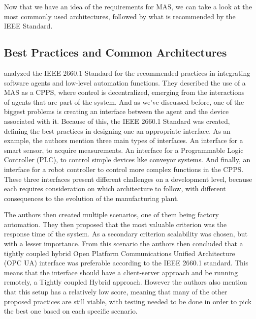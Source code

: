 Now that we have an idea of the requirements for MAS, we can take a look at the most commonly used architectures, followed by what is recommended by the IEEE Standard.

\subsection{Best Practices and Common Architectures}

\citeauthor{Leitao2021} \cite{Leitao2021} analyzed the IEEE 2660.1 Standard for the recommended practices in integrating software agents and low-level automation functions. They described the use of a MAS as a CPPS, where control is decentralized, emerging from the interactions of agents that are part of the system. And as we've discussed before, one of the biggest problems is creating an interface between the agent and the device associated with it. Because of this, the IEEE 2660.1 Standard was created, defining the best practices in designing one an appropriate interface.
As an example, the authors mention three main types of interfaces. An interface for a smart sensor, to acquire measurements. An interface for a Programmable Logic Controller (PLC), to control simple devices like conveyor systems. And finally, an interface for a robot controller to control more complex functions in the CPPS. These three interfaces present different challenges on a development level, because each requires consideration on which architecture to follow, with different consequences to the evolution of the manufacturing plant.

The authors then created multiple scenarios, one of them being factory automation. They then proposed that the most valuable criterion was the response time of the system. As a secondary criterion scalability was chosen, but with a lesser importance. From this scenario the authors then concluded that a tightly coupled hybrid Open Platform Communications Unified Architecture (OPC UA) interface was preferable according to the IEEE 2660.1 standard. This means that the interface should have a client-server approach and be running remotely, a Tightly coupled Hybrid approach. However the authors also mention that this setup has a relatively low score, meaning that many of the other proposed practices are still viable, with testing needed to be done in order to pick the best one based on each specific scenario.


